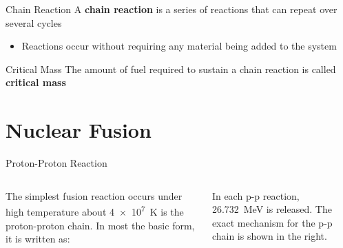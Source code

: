 \documentclass[12pt,compress,aspectratio=169]{beamer}
\begin{document}
%
%



\begin{frame}{Chain Reaction}
  A \textbf{chain reaction} is a series of reactions that can repeat over
  several cycles
  \begin{itemize}
  \item Reactions occur without requiring any material being added to the
    system %
  \end{itemize}
  \begin{center}
  \end{center}
\end{frame}




\begin{frame}{Critical Mass}
  The amount of fuel required to sustain a chain reaction is called
  \textbf{critical mass}
  \begin{center}
  \end{center}
\end{frame}



\section{Nuclear Fusion}

\begin{frame}{Proton-Proton Reaction}
  \begin{columns}
    The simplest fusion reaction occurs under high temperature about
    \SI{4e7}{\kelvin} is the proton-proton chain. In most the basic form, it is
    written as:

    
    \vspace{-.2in}In each p-p reaction, \SI{26.732}{\mega\electronvolt} is
    released. The exact mechanism for the p-p chain is shown in the right.
    
  \end{columns}
\end{frame}
\end{document}
